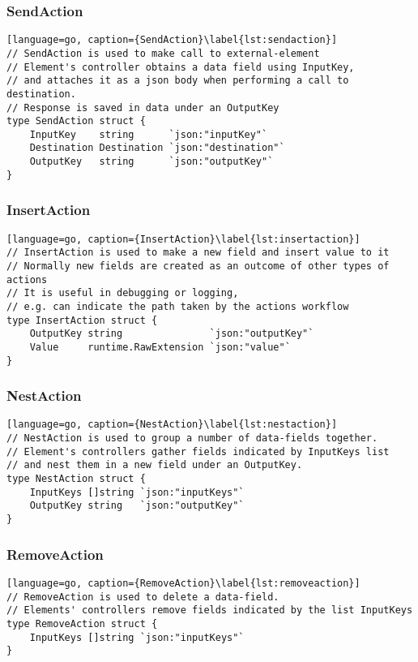 \subsubsection{SendAction}
\begin{lstlisting}[language=go, caption={SendAction}\label{lst:sendaction}]
// SendAction is used to make call to external-element
// Element's controller obtains a data field using InputKey,
// and attaches it as a json body when performing a call to destination.
// Response is saved in data under an OutputKey
type SendAction struct {
	InputKey    string      `json:"inputKey"`
	Destination Destination `json:"destination"`
	OutputKey   string      `json:"outputKey"`
}
\end{lstlisting}

\subsubsection{InsertAction}
\begin{lstlisting}[language=go, caption={InsertAction}\label{lst:insertaction}]
// InsertAction is used to make a new field and insert value to it
// Normally new fields are created as an outcome of other types of actions
// It is useful in debugging or logging, 
// e.g. can indicate the path taken by the actions workflow
type InsertAction struct {
	OutputKey string               `json:"outputKey"`
	Value     runtime.RawExtension `json:"value"`
}
\end{lstlisting}

\subsubsection{NestAction}
\begin{lstlisting}[language=go, caption={NestAction}\label{lst:nestaction}]
// NestAction is used to group a number of data-fields together.
// Element's controllers gather fields indicated by InputKeys list
// and nest them in a new field under an OutputKey.
type NestAction struct {
	InputKeys []string `json:"inputKeys"`
	OutputKey string   `json:"outputKey"`
}
\end{lstlisting}

\subsubsection{RemoveAction}
\begin{lstlisting}[language=go, caption={RemoveAction}\label{lst:removeaction}]
// RemoveAction is used to delete a data-field.
// Elements' controllers remove fields indicated by the list InputKeys
type RemoveAction struct {
	InputKeys []string `json:"inputKeys"`
}
\end{lstlisting}


